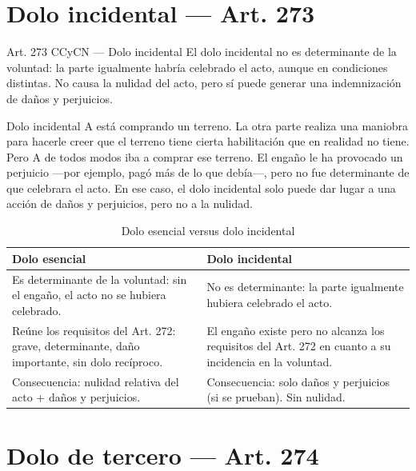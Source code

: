 \documentclass[12pt,oneside]{book}
\begin{document}
\section{Dolo incidental --- Art. 273}

\begin{articulo}{Art. 273 CCyCN --- Dolo incidental}
El dolo incidental no es determinante de la voluntad: la parte igualmente habría celebrado el acto, aunque en condiciones distintas. No causa la nulidad del acto, pero sí puede generar una indemnización de daños y perjuicios.
\end{articulo}

\begin{example}{Dolo incidental}
A está comprando un terreno. La otra parte realiza una maniobra para hacerle creer que el terreno tiene cierta habilitación que en realidad no tiene. Pero A de todos modos iba a comprar ese terreno. El engaño le ha provocado un perjuicio ---por ejemplo, pagó más de lo que debía---, pero no fue determinante de que celebrara el acto. En ese caso, el dolo incidental solo puede dar lugar a una acción de daños y perjuicios, pero no a la nulidad.
\end{example}

\begin{table}[H]
\centering
\begin{tabularx}{\textwidth}{>{\raggedright\arraybackslash}X >{\raggedright\arraybackslash}X}
\toprule
\textbf{Dolo esencial} & \textbf{Dolo incidental} \\
\midrule
Es determinante de la voluntad: sin el engaño, el acto no se hubiera celebrado. & No es determinante: la parte igualmente hubiera celebrado el acto. \\[4pt]
Reúne los requisitos del Art. 272: grave, determinante, daño importante, sin dolo recíproco. & El engaño existe pero no alcanza los requisitos del Art. 272 en cuanto a su incidencia en la voluntad. \\[4pt]
Consecuencia: nulidad relativa del acto + daños y perjuicios. & Consecuencia: solo daños y perjuicios (si se prueban). Sin nulidad. \\
\bottomrule
\end{tabularx}
\caption{Dolo esencial versus dolo incidental}
\end{table}

\section{Dolo de tercero --- Art. 274}
\end{document}
